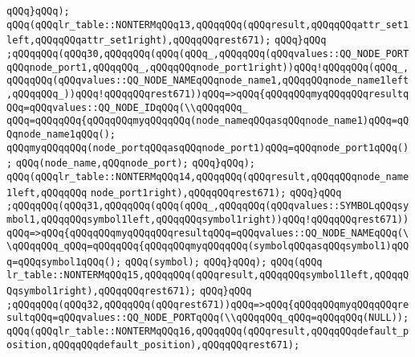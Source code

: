 \verb|qQQq}qQQq);|\newline
\verb|qQQq(qQQqlr_table::NONTERMqQQq13,qQQqqQQq(qQQqresult,qQQqqQQqattr_set1left,qQQqqQQqattr_set1right),qQQqqQQqrest671);|\newline
\verb|qQQq}qQQq|\newline
\verb|;qQQqqQQq(qQQq30,qQQqqQQq(qQQq(qQQq_,qQQqqQQq(qQQqvalues::QQ_NODE_PORTqQQqnode_port1,qQQqqQQq_,qQQqqQQqnode_port1right))qQQq!qQQqqQQq(qQQq_,qQQqqQQq(qQQqvalues::QQ_NODE_NAMEqQQqnode_name1,qQQqqQQqnode_name1left,qQQqqQQq_))qQQq!qQQqqQQqrest671))qQQq=>qQQq{qQQqqQQqmyqQQqqQQqresultqQQq=qQQqvalues::QQ_NODE_IDqQQq(\\qQQqqQQq_|\newline
\verb|qQQq=qQQqqQQq{qQQqqQQqmyqQQqqQQq(node_nameqQQqasqQQqnode_name1)qQQq=qQQqnode_name1qQQq();|\newline
\verb|qQQqmyqQQqqQQq(node_portqQQqasqQQqnode_port1)qQQq=qQQqnode_port1qQQq();|\newline
\verb|qQQq(node_name,qQQqnode_port);|\newline
\verb|qQQq}qQQq);|\newline
\verb|qQQq(qQQqlr_table::NONTERMqQQq14,qQQqqQQq(qQQqresult,qQQqqQQqnode_name1left,qQQqqQQq|\newline
\verb|node_port1right),qQQqqQQqrest671);|\newline
\verb|qQQq}qQQq|\newline
\verb|;qQQqqQQq(qQQq31,qQQqqQQq(qQQq(qQQq_,qQQqqQQq(qQQqvalues::SYMBOLqQQqsymbol1,qQQqqQQqsymbol1left,qQQqqQQqsymbol1right))qQQq!qQQqqQQqrest671))qQQq=>qQQq{qQQqqQQqmyqQQqqQQqresultqQQq=qQQqvalues::QQ_NODE_NAMEqQQq(\\qQQqqQQq_qQQq=qQQqqQQq{qQQqqQQqmyqQQqqQQq(symbolqQQqasqQQqsymbol1)qQQq=qQQqsymbol1qQQq();|\newline
\verb|qQQq(symbol);|\newline
\verb|qQQq}qQQq);|\newline
\verb|qQQq(qQQq|\newline
\verb|lr_table::NONTERMqQQq15,qQQqqQQq(qQQqresult,qQQqqQQqsymbol1left,qQQqqQQqsymbol1right),qQQqqQQqrest671);|\newline
\verb|qQQq}qQQq|\newline
\verb|;qQQqqQQq(qQQq32,qQQqqQQq(qQQqrest671))qQQq=>qQQq{qQQqqQQqmyqQQqqQQqresultqQQq=qQQqvalues::QQ_NODE_PORTqQQq(\\qQQqqQQq_qQQq=qQQqqQQq(NULL));|\newline
\verb|qQQq(qQQqlr_table::NONTERMqQQq16,qQQqqQQq(qQQqresult,qQQqqQQqdefault_position,qQQqqQQqdefault_position),qQQqqQQqrest671);|\newline
